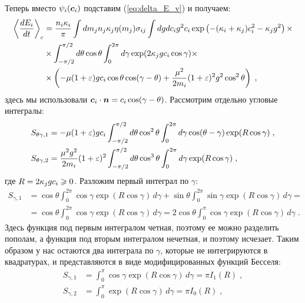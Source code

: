 Теперь вместо $\psi_i(\bm{c}_i)$ подставим (\ref{eq:delta_E_v}) и получаем:
\begin{equation}
  \begin{split}
    \left\langle\frac{dE_i}{dt}\right\rangle_c &= \frac{n_i\kappa_i}{\pi}\int dm_jn_j\kappa_j\eta(m_j)\sigma_{ij}
    \int dgdc_i g^2c_i\exp\left(-(\kappa_i+\kappa_j)c^2_i-\kappa_jg^2\right)\times\\
    &\times\int_{-\pi/2}^{\pi/2}d\theta\cos\theta\int_{0}^{2\pi}d\gamma\exp(2\kappa_jgc_i\cos\gamma)\times \\
    &\times\left(-\mu(1+\varepsilon)gc_i\cos\theta\cos(\gamma-\theta)+\frac{\mu^2}{2m_i}(1+\varepsilon)^2g^2\cos^2\theta\right)\;,
  \end{split}
\end{equation}
здесь мы использовали $\bm{c}_i\cdot\bm{n}=c_i\cos(\gamma-\theta)$. Рассмотрим отдельно угловые интегралы:
\begin{equation}
  \begin{split}
    S_{\theta\gamma,1} &= -\mu(1+\varepsilon)gc_i\int_{-\pi/2}^{\pi/2}d\theta\cos^2\theta\int_{0}^{2\pi}d\gamma\cos(\theta-\gamma)\exp(R\cos\gamma)\;,\\
    S_{\theta\gamma,2} &= \frac{\mu^2g^2}{2m_i}(1+\varepsilon)^2\int_{-\pi/2}^{\pi/2}d\theta\cos^3\theta\int_0^{2\pi}d\gamma\exp(R\cos\gamma)\;,
  \end{split}
\end{equation}
где $R=2\kappa_jgc_i\geqslant 0$. Разложим первый интеграл по $\gamma$:
\begin{equation}
  \begin{split}
    S_{\gamma,1} &= \cos\theta\int_{0}^{2\pi}\cos\gamma\exp(R\cos\gamma)\,d\gamma+\sin\theta\int_{0}^{2\pi}\sin\gamma\exp(R\cos\gamma)\,d\gamma=\\
    &=\cos\theta\int_{0}^{2\pi}\cos\gamma\exp(R\cos\gamma)\,d\gamma = 2\cos\theta\int_{0}^{\pi}\cos\gamma\exp(R\cos\gamma)\,d\gamma\;.
  \end{split}
\end{equation}
Здесь функция под первым интегралом четная, поэтому ее можно разделить пополам, а функция под вторым интегралом нечетная, и поэтому исчезает.
Таким образом у нас остаются два интеграла по $\gamma$, которые не интегрируются в квадратурах, и представляются в виде модифицированных функций 
Бесселя:
\begin{equation}
  \begin{split}
    S_{\gamma,1} &= \int_{0}^{\pi}\cos\gamma\exp(R\cos\gamma)\,d\gamma = \pi I_1(R)\;,\\
    S_{\gamma,2} &= \int_{0}^{\pi}\exp(R\cos\gamma)\,d\gamma = \pi I_0(R)\;,
  \end{split}
\end{equation}

